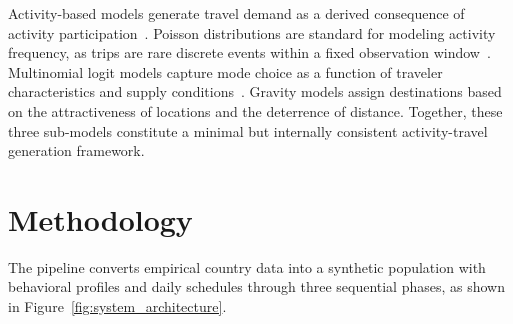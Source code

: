 \documentclass[sustainability,article,submit,pdftex,moreauthors]{Definitions/mdpi}
\begin{document}
Activity-based models generate travel demand as a derived consequence of
activity participation~\cite{bhat1999activity,arentze2000albatross}.
Poisson distributions are standard for modeling activity frequency, as
trips are rare discrete events within a fixed observation
window~\cite{arentze2000albatross}. Multinomial logit models capture
mode choice as a function of traveler characteristics and supply
conditions~\cite{ben1985discrete}. Gravity models assign destinations
based on the attractiveness of locations and the deterrence of distance.
Together, these three sub-models constitute a minimal but internally
consistent activity-travel generation framework.

\section{Methodology}
\label{sec:methodology}

The pipeline converts empirical country data into a synthetic population
with behavioral profiles and daily schedules through three sequential phases,
as shown in Figure~\ref{fig:system_architecture}.
\end{document}
